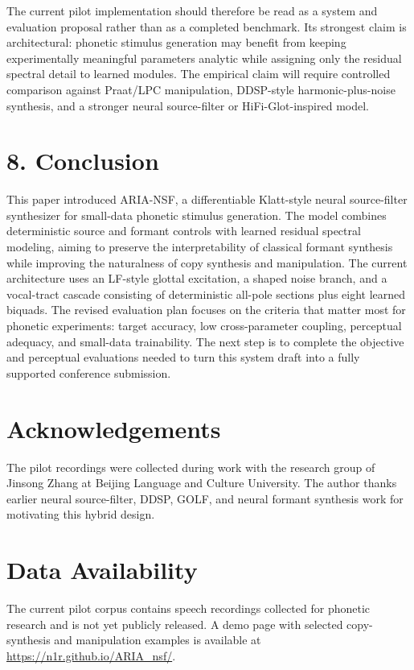 The current pilot implementation should therefore be read as a system
and evaluation proposal rather than as a completed benchmark. Its
strongest claim is architectural: phonetic stimulus generation may
benefit from keeping experimentally meaningful parameters analytic while
assigning only the residual spectral detail to learned modules. The
empirical claim will require controlled comparison against Praat/LPC
manipulation, DDSP-style harmonic-plus-noise synthesis, and a stronger
neural source-filter or HiFi-Glot-inspired model.

\section{8. Conclusion}\label{conclusion}

This paper introduced ARIA-NSF, a differentiable Klatt-style neural
source-filter synthesizer for small-data phonetic stimulus generation.
The model combines deterministic source and formant controls with
learned residual spectral modeling, aiming to preserve the
interpretability of classical formant synthesis while improving the
naturalness of copy synthesis and manipulation. The current architecture
uses an LF-style glottal excitation, a shaped noise branch, and a
vocal-tract cascade consisting of deterministic all-pole sections plus
eight learned biquads. The revised evaluation plan focuses on the
criteria that matter most for phonetic experiments: target accuracy, low
cross-parameter coupling, perceptual adequacy, and small-data
trainability. The next step is to complete the objective and perceptual
evaluations needed to turn this system draft into a fully supported
conference submission.

\section{Acknowledgements}\label{acknowledgements}

The pilot recordings were collected during work with the research group
of Jinsong Zhang at Beijing Language and Culture University. The author
thanks earlier neural source-filter, DDSP, GOLF, and neural formant
synthesis work for motivating this hybrid design.

\section{Data Availability}\label{data-availability}

The current pilot corpus contains speech recordings collected for
phonetic research and is not yet publicly released. A demo page with
selected copy-synthesis and manipulation examples is available at
\url{https://n1r.github.io/ARIA_nsf/}.

